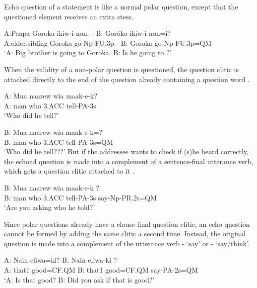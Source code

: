 Echo question of a statement is like a normal polar question, except that the questioned element receives an extra stess.

\ea%
\label{ex:x1189}
\gll A:Paapa  Goroka  ikiw-i-non.  -  B:  Gor\'oka  ikiw-i-non=i? \\
A:elder.sibling  Goroka  go-Np-FU.3p  -  B:  Goroka  go-Np-FU.3p=QM      \\
\glt `A: Big brother is going to Goroka. B: Is he going to ?'
\z





When the validity of a non-polar question  is questioned, the question clitic is attached directly to the end of the question already containing a question word . 

\ea%
\label{ex:x1190}
\gll A:  Mua  naarew  wia  maak-e-k?  \\
A:  man  who  3.ACC  tell-PA-3s      \\
\glt `Who did he tell?'
\z





\ea%
\label{ex:x1191}
\gll B:  Mua  naarew  wia  maak-e-k=? \\
B:  man  who  3.ACC  tell-PA-3s=QM      \\
\glt `Who did he tell???'
\z
But if the addressee wants to check if (s)he heard correctly, the echoed question is made into a complement of a sentence-final utterance verb, which gets a question clitic attached to it .

\ea%
\label{ex:x1192}
\gll B:  Mua  naarew  wia  maak-e-k  ? \\
B:  man  who  3.ACC  tell-PA-3s  say-Np-PR.2s=QM      \\
\glt `Are you asking who he told?'
\z





Since polar questions already have a clause-final question clitic, an echo question cannot be formed by adding the same clitic a second time. Instead, the original question is made into a complement of the utterance verb - `say' or - `say/think'. 

\ea%
\label{ex:x1193}
\gll A:  Nain  eliwa=ki?  B:  Nain  eliwa-ki  ? \\
A:  that1  good=CF.QM  B:  that1  good=CF.QM  say-PA-2s=QM      \\
\glt `A: Is that good?  B: Did you ask if that is good?'
\z





